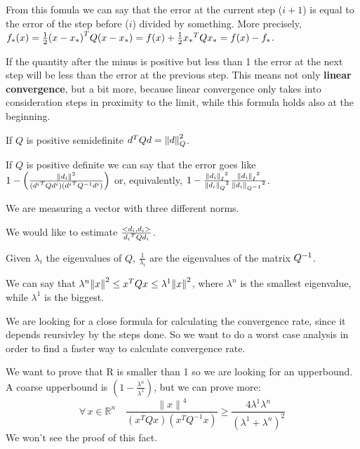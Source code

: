 \documentclass[ComputationalMathematics.tex]{subfiles}
\begin{document}
From this fomula we can say that the error at the current step ($i+1$) is equal to the error of the step before ($i$) divided by something. 
More precisely, $f_*(x) = \frac{1}{2} {(x-x_*)}^{T} Q (x-x_*) = f(x) + \frac{1}{2}{x_*}^{T}Qx_* = f(x) - f_*$.

If the quantity after the minus is positive but less than 1 the error at the next step will be less than the error at the previous step. This means not only \textbf{linear convergence}, but a bit more, because linear convergence only takes into consideration steps in proximity to the limit, while this formula holds also at the beginning.

\begin{proposition}
  If $Q$ is positive semidefinite ${d}^{T}Qd = {\|d\|}_{Q}^{2}$.
\end{proposition}

\begin{proposition}
  If $Q$ is positive definite we can say that the error goes like $1 - \left( \frac{{\|d_i\|}^{2}}{({d^{i}}^{T} Q d^{i}) ({d^{i}}^{T} {Q}^{-1} d^{i})} \right)$ or, equivalently, $1 - \frac{{{\left\lVert d_i\right\rVert}_I}^2}{{{\left\lVert d_i\right\rVert}_Q}^2} \frac{{{\left\lVert d_i\right\rVert}_I}^2}{{{\left\lVert d_i\right\rVert}_{{Q}^{-1}}}^2}$.
\end{proposition}
  
We are measuring a vector with three different norms.

We would like to estimate $\frac{<d_{i}, d_{i}>}{{d_{i}}^{T}Qd_{i}}$.
  
  Given $\lambda_{i}$ the eigenvalues of $Q$, $\frac{1}{\lambda_{i}}$ are the eigenvalues of the matrix ${Q}^{-1}$. 

  We can say that $\lambda^{n} {\left\lVert x\right\rVert}^2 \le {x}^{T}Qx \le \lambda^{1} {\left\lVert x\right\rVert}^2$, where $\lambda^{n}$ is the smallest eigenvalue, while $\lambda^{1}$ is the biggest.

We are looking for a close formula for calculating the convergence rate, since it depends reursivley by the steps done. So we want to do a worst case analysis in order to find a faster way to calculate convergence rate.

  We want to prove that R is smaller than 1 so we are looking for an upperbound. A coarse upperbound is $(1 - \frac{\lambda^{n}}{\lambda^{1}})$, but we can prove more: 
\[
  \forall \, x \in \mathds{R}^n \quad
  \frac{{\| x \|}^{4}}{(x^{T} Q x)(x^{T} Q^{-1} x)} \geq
  \frac{ 4 {\lambda}^{1} {\lambda}^{n} }{{( {\lambda}^{1} + {\lambda}^{n} )}^2}
\]
  We won't see the proof of this fact.
\end{document}
